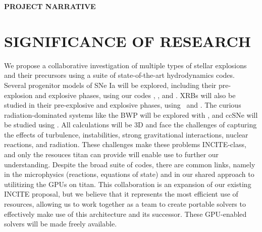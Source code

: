 \documentclass[11pt,letterpaper,english]{article}
\begin{document}
\pagestyle{fancy} 
 \renewcommand{%
\headrulewidth}{0.0pt}

\begin{center}
{\bf PROJECT NARRATIVE}
\end{center}


\section{SIGNIFICANCE OF RESEARCH}


We propose a collaborative investigation of multiple types of stellar
explosions and their precursors using a suite of state-of-the-art
hydrodynamics codes.  Several progenitor models of SNe Ia will be
explored, including their pre-explosion and explosive phases, using
our codes \maestro, \castro, and \flash.  XRBs will also be studied in
their pre-explosive and explosive phases, using \maestro\ and \castro.
The curious radiation-dominated systems like the BWP will be explored
with \castro, and ccSNe will be studied using \chimera.  All
calculations will be 3D and face the challenges of capturing the
effects of turbulence, instabilities, strong gravitational
interactions, nuclear reactions, and radiation.  These challenges make
these problems INCITE-class, and only the resouces titan can provide
will enable use to further our understanding.  Despite the broad suite
of codes, there are common links, namely in the microphysics
(reactions, equations of state) and in our shared approach to
utilitizing the GPUs on titan.  This collaboration is an expansion of
our existing INCITE proposal, but we believe that it represents the
most efficient use of resources, allowing us to work together as a
team to create portable solvers to effectively make use of this
architecture and its successor.  These GPU-enabled solvers will be
made freely available.
\end{document}
